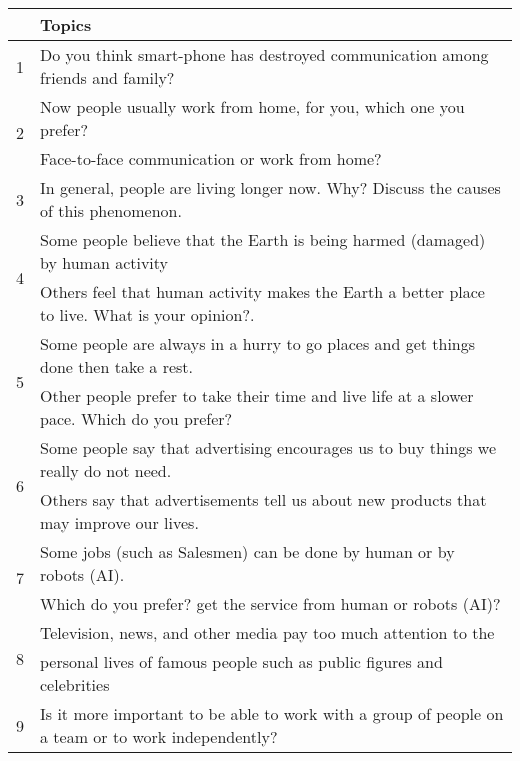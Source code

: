 \documentclass[runningheads]{llncs}
\begin{document}
\begin{tabular}{ll}
                    & Topics                                                                                              \\ 
\hline
1                   & Do you think smart-phone has destroyed communication among friends and family?                                    \\
\multirow{2}{*}{2}  & Now people usually work from home, for you, which one you prefer?~                    \\
                    & Face-to-face communication or work from home?        \\
3                   & In general, people are living longer now. Why? Discuss the causes of this phenomenon.  \\
\multirow{2}{*}{4}  & Some people believe that the Earth is being harmed (damaged) by human activity ~                            \\
                    & Others feel that human activity makes the Earth a better place to live. What is your opinion?.                                                         \\
\multirow{2}{*}{5}  & Some people are always in a hurry to go places and get things done then take a rest.                                 \\
                    & Other people prefer to take their time and live life at a slower pace. Which do you prefer?         \\
\multirow{2}{*}{6}  & Some people say that advertising encourages us to buy things we really do not need.                 \\
                    & Others say that advertisements tell us about new products that may improve our lives.~ ~            \\
\multirow{2}{*}{7}  & Some jobs (such as Salesmen) can be done by human or by robots (AI).~                       \\
                    & Which do you prefer? get the service from human or robots (AI)?                                  \\
\multirow{2}{*}{8}  & Television, news, and other media pay too much attention to the                                     \\
                    & personal lives of famous people such as public figures and celebrities                              \\
9                   & Is it more important to be able to work with a group of people on a team or to work independently?                \\

\end{tabular}
\end{document}
